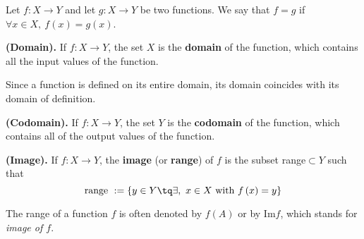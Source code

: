 
\begin{definition}
    Let $f:X\to Y$ and let $g:X\to Y$ be two functions. We say that $f = g$ if $\forall x\in X,\ f\left( x \right) = g\left( x \right)$.
\end{definition}

\begin{definition}
    \textbf{(Domain).} If $f:X\to Y$, the set $X$ is the \textbf{domain} of the function, which contains all the input values of the function. 
\end{definition}
\begin{remark}
    Since a function is defined on its entire domain, its domain coincides with its domain of definition.
\end{remark}
\begin{definition}
    \textbf{(Codomain).} If $f:X\to Y$, the set $Y$ is the \textbf{codomain} of the function, which contains all of the output values of the function.
\end{definition}
\begin{definition}
    \textbf{(Image).} If $f:X\to Y$, the \textbf{image} (or \textbf{range}) of $f$ is the subset range$\subset Y$ such that
    \begin{equation}
        \textrm{range }:= \{y\in Y\tq \exists,\ x\in X\textrm{ with } f\left( x \right) = y\} 
    \end{equation}
\end{definition}

\begin{notation}
    The range of a function $f$ is often denoted by $f\left( A \right) $ or by Im$f$, which stands for \textit{image of $f$}.
\end{notation}

